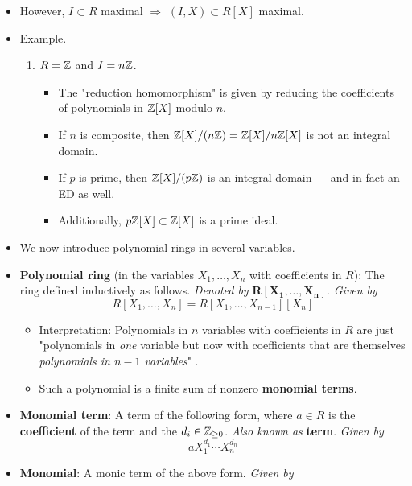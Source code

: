 \documentclass[../notes.tex]{subfiles}
\begin{document}
\begin{itemize}
    \item However, $I\subset R$ maximal $\Rightarrow$ $(I,X)\subset R[X]$ maximal.
    \item Example.
    \begin{enumerate}
        \item $R=\mathbb{Z}$ and $I=n\mathbb{Z}$.
        \begin{itemize}
            \item The "reduction homomorphism" is given by reducing the coefficients of polynomials in $\mathbb{Z}[X]$ modulo $n$.
            \item If $n$ is composite, then $\mathbb{Z}[X]/(n\mathbb{Z})=\mathbb{Z}[X]/n\mathbb{Z}[X]$ is not an integral domain.
            \item If $p$ is prime, then $\mathbb{Z}[X]/(p\mathbb{Z})$ is an integral domain --- and in fact an ED as well.
            \item Additionally, $p\mathbb{Z}[X]\subset\mathbb{Z}[X]$ is a prime ideal.
        \end{itemize}
    \end{enumerate}
    \item We now introduce polynomial rings in several variables.
    \item \textbf{Polynomial ring} (in the variables $X_1,\dots,X_n$ with coefficients in $R$): The ring defined inductively as follows. \emph{Denoted by} $\bm{R[X_1,\ldots,X_n]}$. \emph{Given by}
    \begin{equation*}
        R[X_1,\dots,X_n] = R[X_1,\dots,X_{n-1}][X_n]
    \end{equation*}
    \begin{itemize}
        \item Interpretation: Polynomials in $n$ variables with coefficients in $R$ are just "polynomials in \emph{one} variable but now with coefficients that are themselves \emph{polynomials in $n-1$ variables}" \parencite[296-97]{bib:DummitFoote}.
        \item Such a polynomial is a finite sum of nonzero \textbf{monomial terms}.
    \end{itemize}
    \item \textbf{Monomial term}: A term of the following form, where $a\in R$ is the \textbf{coefficient} of the term and the $d_i\in{\mathbb{Z}_{\geq 0}}$. \emph{Also known as} \textbf{term}. \emph{Given by}
    \begin{equation*}
        aX_1^{d_1}\cdots X_n^{d_n}
    \end{equation*}
    \item \textbf{Monomial}: A monic term of the above form. \emph{Given by}

\end{itemize}
\end{document}
